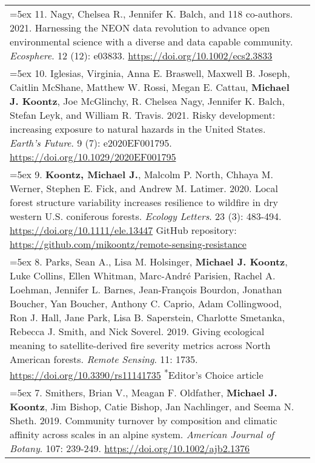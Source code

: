 \begin{longtable}{@{} >{\raggedright}p{6.10in} >{\raggedleft}X @{}}
\hangindent=5ex 11. Nagy, Chelsea R., Jennifer K. Balch, and 118 co-authors. 2021. Harnessing the NEON data revolution to advance open environmental science with a diverse and data capable community. \emph{Ecosphere}. 12 (12): e03833. \href{https://doi.org/10.1002/ecs2.3833}{https://doi.org/10.1002/ecs2.3833} & \tabularnewline

\hangindent=5ex 10. Iglesias, Virginia, Anna E. Braswell, Maxwell B. Joseph, Caitlin McShane, Matthew W. Rossi, Megan E. Cattau, \textbf{Michael J. Koontz}, Joe McGlinchy, R. Chelsea Nagy, Jennifer K. Balch, Stefan Leyk, and William R. Travis. 2021. Risky development: increasing exposure to natural hazards in the United States. \emph{Earth's Future}. 9 (7): e2020EF001795. \href{https://doi.org/10.1029/2020EF001795}{https://doi.org/10.1029/2020EF001795} & \tabularnewline

\hangindent=5ex 9. \textbf{Koontz, Michael J.}, Malcolm P. North, Chhaya M. Werner, Stephen E. Fick, and Andrew M. Latimer. 2020. Local forest structure variability increases resilience to wildfire in dry western U.S. coniferous forests. \emph{Ecology Letters}. 23 (3): 483-494. \href{https://doi.org/10.1111/ele.13447}{https://doi.org/10.1111/ele.13447} 
\newline GitHub repository: \href{https://github.com/mikoontz/remote-sensing-resistance}{https://github.com/mikoontz/remote-sensing-resistance} & \tabularnewline

\hangindent=5ex 8. Parks, Sean A., Lisa M. Holsinger, \textbf{Michael J. Koontz}, Luke Collins, Ellen Whitman, Marc-Andr\'e Parisien, Rachel A. Loehman, Jennifer L. Barnes, Jean-Fran\c{c}ois Bourdon, Jonathan Boucher, Yan Boucher, Anthony C. Caprio, Adam Collingwood, Ron J. Hall, Jane Park, Lisa B. Saperstein, Charlotte Smetanka, Rebecca J. Smith, and Nick Soverel. 2019. Giving ecological meaning to satellite-derived fire severity metrics across North American forests. \emph{Remote Sensing}. 11: 1735. \href{https://doi.org/10.3390/rs11141735}{https://doi.org/10.3390/rs11141735} \newline \textsuperscript{*}Editor's Choice article & \tabularnewline

\hangindent=5ex 7. Smithers, Brian V., Meagan F. Oldfather, \textbf{Michael J. Koontz}, Jim Bishop, Catie Bishop, Jan Nachlinger, and Seema N. Sheth. 2019. Community turnover by composition and climatic affinity across scales in an alpine system. \emph{American Journal of Botany}. 107: 239-249. \href{https://doi.org/10.1002/ajb2.1376}{https://doi.org/10.1002/ajb2.1376} & \tabularnewline


\end{longtable}
